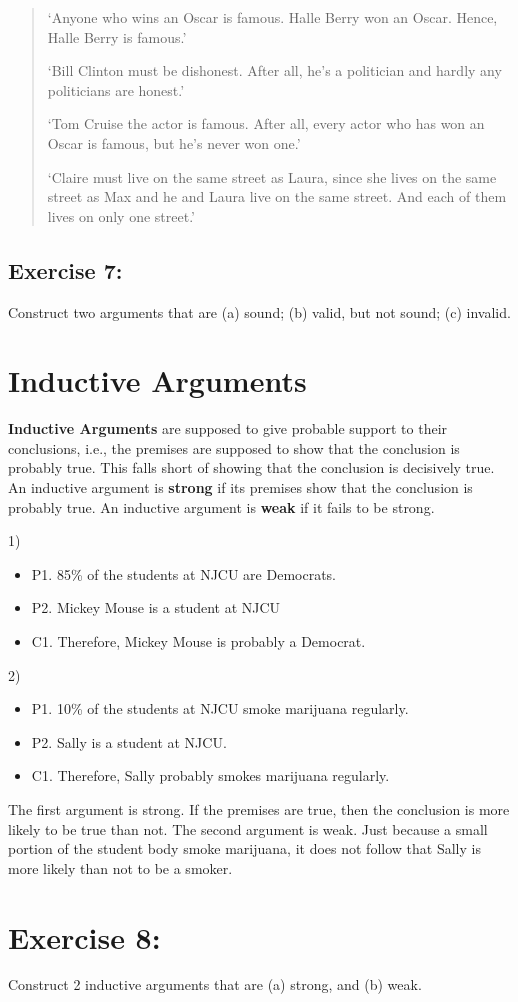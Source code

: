 \documentclass[report,oneside]{memoir}
\begin{document}
\begin{quote}

`Anyone who wins an Oscar is famous. Halle Berry won an Oscar. Hence, Halle Berry is famous.'

`Bill Clinton must be dishonest. After all, he's a politician and hardly any politicians are honest.'

`Tom Cruise the actor is famous. After all, every actor who has won an Oscar is famous, but he's never won one.'

`Claire must live on the same street as Laura, since she lives on the same street as Max and he and Laura live on the same street. And each of them lives on only one street.'
\end{quote}

\subsection{Exercise 7:}
\label{exercise7:}

Construct two arguments that are (a) sound; (b) valid, but not sound; (c) invalid.

\section{Inductive Arguments}
\label{inductivearguments}

\textbf{Inductive Arguments} are supposed to give probable support to their conclusions, i.e., the premises are supposed to show that the conclusion is probably true. This falls short of showing that the conclusion is decisively true. An inductive argument is \textbf{strong} if its premises show that the conclusion is probably true. An inductive argument is \textbf{weak} if it fails to be strong.


1)

\begin{itemize}
\item P1. 85\% of the students at NJCU are Democrats.

\item P2. Mickey Mouse is a student at NJCU

\item C1. Therefore, Mickey Mouse is probably a Democrat.

\end{itemize}

2)

\begin{itemize}
\item P1. 10\% of the students at NJCU smoke marijuana regularly.

\item P2. Sally is a student at NJCU.

\item C1. Therefore, Sally probably smokes marijuana regularly.

\end{itemize}
The first argument is strong. If the premises are true, then the conclusion is more likely to be true than not. The second argument is weak. Just because a small portion of the student body smoke marijuana, it does not follow that Sally is more likely than not to be a smoker.

\section{Exercise 8:}
\label{exercise8:}

Construct 2 inductive arguments that are (a) strong, and (b) weak. 
\end{document}
